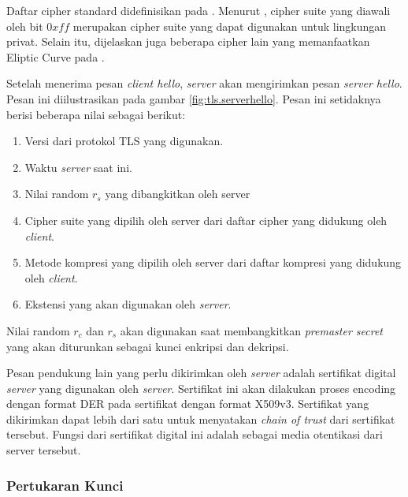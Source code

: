  Daftar cipher standard didefinisikan pada \textcite{rfc5246}. Menurut \textcite{rfc5246}, cipher suite yang diawali oleh bit $0xff$ merupakan cipher suite yang dapat digunakan untuk lingkungan privat. Selain itu, dijelaskan juga beberapa cipher lain yang memanfaatkan Eliptic Curve pada \textcite{rfc4492}. 

Setelah menerima pesan \emph{client hello}, \emph{server} akan mengirimkan pesan \emph{server hello}. Pesan ini diilustrasikan pada gambar \ref{fig:tls.serverhello}. Pesan ini setidaknya berisi beberapa nilai sebagai berikut:
\begin{enumerate}
  \item Versi dari protokol TLS yang digunakan.
  \item Waktu \emph{server} saat ini.
  \item Nilai random $r_s$ yang dibangkitkan oleh server 
  \item Cipher suite yang dipilih oleh server dari daftar cipher yang didukung oleh \emph{client}.
  \item Metode kompresi yang dipilih oleh server dari daftar kompresi yang didukung oleh \emph{client}.
  \item Ekstensi yang akan digunakan oleh \emph{server}.
\end{enumerate}

Nilai random $r_c$ dan $r_s$ akan digunakan saat membangkitkan \emph{premaster secret} yang akan diturunkan sebagai kunci enkripsi dan dekripsi.

Pesan pendukung lain yang perlu dikirimkan oleh \emph{server} adalah sertifikat digital \emph{server} yang digunakan oleh \emph{server}. Sertifikat ini akan dilakukan proses encoding dengan format DER pada sertifikat dengan format X509v3. Sertifikat yang dikirimkan dapat lebih dari satu untuk menyatakan \emph{chain of trust} dari sertifikat tersebut. Fungsi dari sertifikat digital ini adalah sebagai media otentikasi dari server tersebut.


\subsubsection{Pertukaran Kunci}

